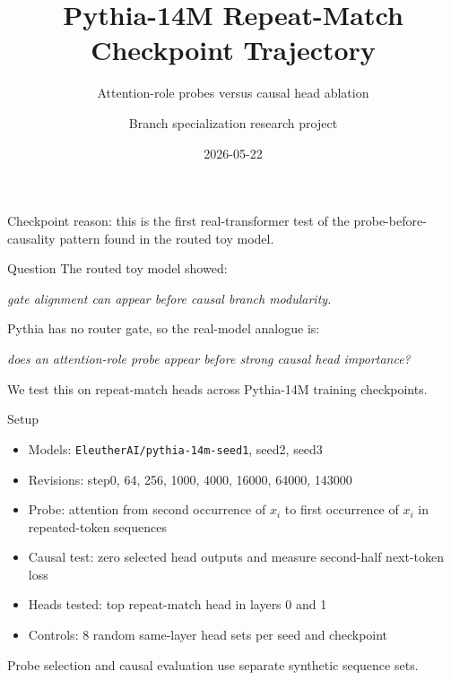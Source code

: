 \documentclass[aspectratio=169]{beamer}
\title[Pythia Repeat-Match Trajectory]{Pythia-14M Repeat-Match Checkpoint Trajectory}
\subtitle{Attention-role probes versus causal head ablation}
\author{Branch specialization research project}
\date{2026-05-22}
\begin{document}
\begin{frame}
  \titlepage
  \vspace{-0.5em}
  \small
  Checkpoint reason: this is the first real-transformer test of the
  probe-before-causality pattern found in the routed toy model.
\end{frame}

\begin{frame}{Question}
  The routed toy model showed:

  \vspace{0.5em}
  \begin{center}
  \textit{gate alignment can appear before causal branch modularity.}
  \end{center}

  \vspace{0.8em}
  Pythia has no router gate, so the real-model analogue is:

  \vspace{0.5em}
  \begin{center}
  \textit{does an attention-role probe appear before strong causal head
  importance?}
  \end{center}

  \vspace{0.8em}
  We test this on repeat-match heads across Pythia-14M training checkpoints.
\end{frame}

\begin{frame}{Setup}
  \begin{itemize}
    \item Models: \texttt{EleutherAI/pythia-14m-seed1}, seed2, seed3
    \item Revisions: step0, 64, 256, 1000, 4000, 16000, 64000, 143000
    \item Probe: attention from second occurrence of $x_i$ to first occurrence
    of $x_i$ in repeated-token sequences
    \item Causal test: zero selected head outputs and measure second-half
    next-token loss
    \item Heads tested: top repeat-match head in layers 0 and 1
    \item Controls: 8 random same-layer head sets per seed and checkpoint
  \end{itemize}

  \vspace{0.5em}
  Probe selection and causal evaluation use separate synthetic sequence sets.
\end{frame}
\end{document}

